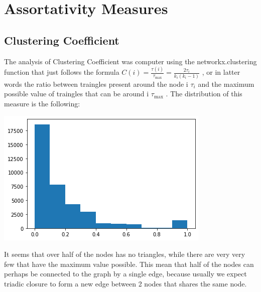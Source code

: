 \documentclass[]{article}
\begin{document}
    \section*{Assortativity Measures}
    \subsection*{Clustering Coefficient}
    The analysis of Clustering Coefficient was computer using the networkx.clustering function that just follows the formula 
    $C(i)= \frac{\tau(i)}{\tau_{\max}} = \frac{2\tau_i}{k_i(k_i-1)}$ , or in latter words the ratio between traingles present around the node i $\tau_i$ and the maximum possible value of traingles that can be around i $\tau_{\max}$ . The distribution of this measure is the following: 
    \begin{center}
        \includegraphics[scale=0.5]{charts/cc_distr.png}
    \end{center}
    It seems that over half of the nodes has no triangles, while there are very very few that have the maximum value possible. This mean that half of the nodes can perhaps be connected to the graph by a single edge, because usually we expect triadic closure to form a new edge between 2 nodes that shares the same node.
\end{document}
